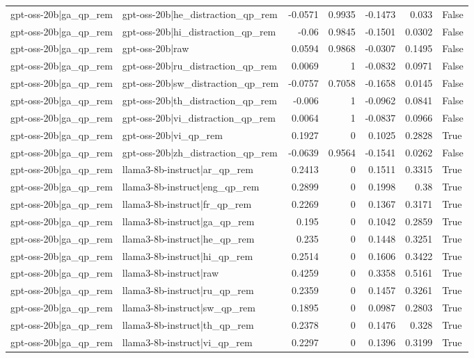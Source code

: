 \begin{table}
\begin{tabular}{l l r r r r l}
gpt-oss-20b|ga_qp_rem & gpt-oss-20b|he_distraction_qp_rem & -0.0571 & 0.9935 & -0.1473 & 0.033 & False \\
gpt-oss-20b|ga_qp_rem & gpt-oss-20b|hi_distraction_qp_rem & -0.06 & 0.9845 & -0.1501 & 0.0302 & False \\
gpt-oss-20b|ga_qp_rem & gpt-oss-20b|raw & 0.0594 & 0.9868 & -0.0307 & 0.1495 & False \\
gpt-oss-20b|ga_qp_rem & gpt-oss-20b|ru_distraction_qp_rem & 0.0069 & 1 & -0.0832 & 0.0971 & False \\
gpt-oss-20b|ga_qp_rem & gpt-oss-20b|sw_distraction_qp_rem & -0.0757 & 0.7058 & -0.1658 & 0.0145 & False \\
gpt-oss-20b|ga_qp_rem & gpt-oss-20b|th_distraction_qp_rem & -0.006 & 1 & -0.0962 & 0.0841 & False \\
gpt-oss-20b|ga_qp_rem & gpt-oss-20b|vi_distraction_qp_rem & 0.0064 & 1 & -0.0837 & 0.0966 & False \\
gpt-oss-20b|ga_qp_rem & gpt-oss-20b|vi_qp_rem & 0.1927 & 0 & 0.1025 & 0.2828 & True \\
gpt-oss-20b|ga_qp_rem & gpt-oss-20b|zh_distraction_qp_rem & -0.0639 & 0.9564 & -0.1541 & 0.0262 & False \\
gpt-oss-20b|ga_qp_rem & llama3-8b-instruct|ar_qp_rem & 0.2413 & 0 & 0.1511 & 0.3315 & True \\
gpt-oss-20b|ga_qp_rem & llama3-8b-instruct|eng_qp_rem & 0.2899 & 0 & 0.1998 & 0.38 & True \\
gpt-oss-20b|ga_qp_rem & llama3-8b-instruct|fr_qp_rem & 0.2269 & 0 & 0.1367 & 0.3171 & True \\
gpt-oss-20b|ga_qp_rem & llama3-8b-instruct|ga_qp_rem & 0.195 & 0 & 0.1042 & 0.2859 & True \\
gpt-oss-20b|ga_qp_rem & llama3-8b-instruct|he_qp_rem & 0.235 & 0 & 0.1448 & 0.3251 & True \\
gpt-oss-20b|ga_qp_rem & llama3-8b-instruct|hi_qp_rem & 0.2514 & 0 & 0.1606 & 0.3422 & True \\
gpt-oss-20b|ga_qp_rem & llama3-8b-instruct|raw & 0.4259 & 0 & 0.3358 & 0.5161 & True \\
gpt-oss-20b|ga_qp_rem & llama3-8b-instruct|ru_qp_rem & 0.2359 & 0 & 0.1457 & 0.3261 & True \\
gpt-oss-20b|ga_qp_rem & llama3-8b-instruct|sw_qp_rem & 0.1895 & 0 & 0.0987 & 0.2803 & True \\
gpt-oss-20b|ga_qp_rem & llama3-8b-instruct|th_qp_rem & 0.2378 & 0 & 0.1476 & 0.328 & True \\
gpt-oss-20b|ga_qp_rem & llama3-8b-instruct|vi_qp_rem & 0.2297 & 0 & 0.1396 & 0.3199 & True \\

\end{tabular}
\end{table}
